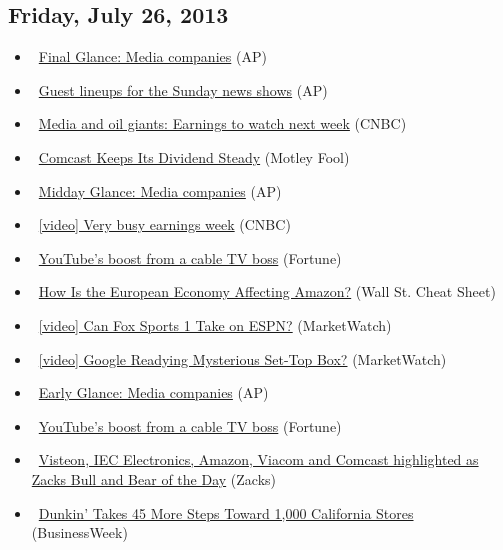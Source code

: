 \documentclass[11pt,asymmetric]{article}
\begin{document}
\subsection*{Friday, July 26, 2013}
\begin{itemize}
\item\ \href{http://finance.yahoo.com/news/final-glance-media-companies-220442669.html}{Final Glance: Media companies} (AP)
\item\ \href{http://finance.yahoo.com/news/guest-lineups-sunday-news-shows-184551803.html}{Guest lineups for the Sunday news shows} (AP)
\item\ \href{http://www.cnbc.com/id/100917763?__source=yahoo%7Cfinance%7Cheadline%7Cheadline%7Cstory&par=yahoo&doc=100917763%7CMedia+and+oil+giants:+Ear}{Media and oil giants: Earnings to watch next week} (CNBC)
\item\ \href{http://www.fool.com/investing/general/2013/07/26/comcast-keeps-its-dividend-steady.aspx?source=eogyholnk0000001}{Comcast Keeps Its Dividend Steady} (Motley Fool)
\item\ \href{http://finance.yahoo.com/news/midday-glance-media-companies-174204814.html}{Midday Glance: Media companies} (AP)
\item\ \href{http://video.cnbc.com/gallery/?video=3000186057&__source=yahoo%7Cheadline%7Cquote%7Cvideo%7C&par=yahoo}{[video] Very busy earnings week} (CNBC)
\item\ \href{http://postcards.blogs.fortune.cnn.com/2013/07/26/youtube-zalaznick-lanzone/?source=yahoo_quote}{YouTube's boost from a cable TV boss} (Fortune)
\item\ \href{http://wallstcheatsheet.com/stocks/how-is-the-european-economy-affecting-amazon.html/?ref=YF}{How Is the European Economy Affecting Amazon?} (Wall St. Cheat Sheet)
\item\ \href{http://www.marketwatch.com/News/Story/Story.aspx?guid=C0A81CFE-8EC0-40B5-939B-202199CA1862&siteid=yhoof2}{[video] Can Fox Sports 1 Take on ESPN?} (MarketWatch)
\item\ \href{http://www.marketwatch.com/News/Story/Story.aspx?guid=B25C808D-D770-4CAE-8BB6-8085FC6994FD&siteid=yhoof2}{[video] Google Readying Mysterious Set-Top Box?} (MarketWatch)
\item\ \href{http://finance.yahoo.com/news/early-glance-media-companies-143357063.html}{Early Glance: Media companies} (AP)
\item\ \href{http://postcards.blogs.fortune.cnn.com/2013/07/26/youtube-zalaznick-langone/?source=yahoo_quote}{YouTube's boost from a cable TV boss} (Fortune)
\item\ \href{http://finance.yahoo.com/news/visteon-iec-electronics-amazon-viacom-120205037.html}{Visteon, IEC Electronics, Amazon, Viacom and Comcast highlighted as Zacks Bull and Bear of the Day} (Zacks)
\item\ \href{http://www.businessweek.com/articles/2013-07-26/dunkin-takes-45-more-steps-toward-1-000-california-stores?campaign_id=yhoo}{Dunkin’ Takes 45 More Steps Toward 1,000 California Stores} (BusinessWeek)
\end{itemize}
\end{document}
